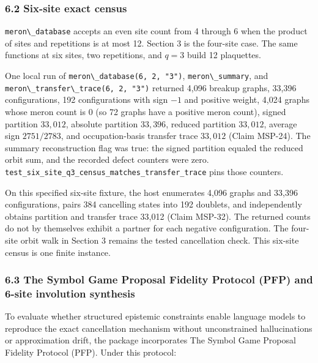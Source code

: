 \documentclass[
  11pt,
]{article}
\newcommand{\passthrough}[1]{#1}
\begin{document}
\subsubsection{6.2 Six-site exact census}\label{six-site-exact-census}

\passthrough{\lstinline!meron\_database!} accepts an even site count
from 4 through 6 when the product of sites and repetitions is at most
12. Section 3 is the four-site case. The same functions at six sites,
two repetitions, and \(q = 3\) build 12 plaquettes.

One local run of \passthrough{\lstinline!meron\_database(6, 2, "3")!},
\passthrough{\lstinline!meron\_summary!}, and
\passthrough{\lstinline!meron\_transfer\_trace(6, 2, "3")!} returned
4,096 breakup graphs, 33,396 configurations, 192 configurations with
sign \(-1\) and positive weight, 4,024 graphs whose meron count is 0 (so
72 graphs have a positive meron count), signed partition \(33{,}012\),
absolute partition \(33{,}396\), reduced partition \(33{,}012\), average
sign \(2751/2783\), and occupation-basis transfer trace \(33{,}012\)
(Claim MSP-24). The summary reconstruction flag was true: the signed
partition equaled the reduced orbit sum, and the recorded defect
counters were zero.
\nolinkurl{test_six_site_q3_census_matches_transfer_trace} pins those
counters.

On this specified six-site fixture, the host enumerates 4,096 graphs and
33,396 configurations, pairs 384 cancelling states into 192 doublets,
and independently obtains partition and transfer trace 33,012 (Claim
MSP-32). The returned counts do not by themselves exhibit a partner for
each negative configuration. The four-site orbit walk in Section 3
remains the tested cancellation check. This six-site census is one
finite instance.

\subsubsection{6.3 The Symbol Game Proposal Fidelity Protocol (PFP) and
6-site involution
synthesis}\label{the-symbol-game-proposal-fidelity-protocol-pfp-and-6-site-involution-synthesis}

To evaluate whether structured epistemic constraints enable language
models to reproduce the exact cancellation mechanism without
unconstrained hallucinations or approximation drift, the package
incorporates The Symbol Game Proposal Fidelity Protocol (PFP). Under
this protocol:
\end{document}
